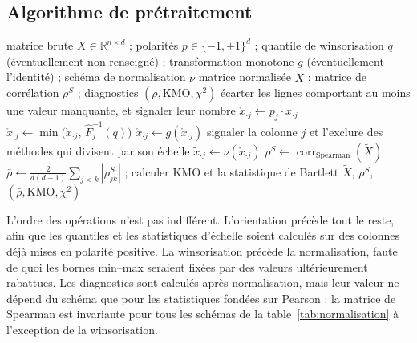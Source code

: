 \documentclass[11pt,a4paper]{article}
\theoremstyle{definition}
\theoremstyle{remark}
\newcommand{\R}{\mathbb{R}}
\newcommand{\abs}[1]{\left\lvert #1 \right\rvert}
\begin{document}
\bigskip

\subsection{Algorithme de prétraitement}

\medskip

\begin{algorithm}[htbp]
  \caption{Prétraitement}
  \label{algo:pretraitement}
  \begin{algorithmic}[1]
    \Require matrice brute $X \in \R^{n \times d}$ ; polarités $p \in \{-1,+1\}^d$ ;
      quantile de winsorisation $q$ (éventuellement non renseigné) ; transformation
      monotone $g$ (éventuellement l'identité) ; schéma de normalisation $\nu$
    \Ensure matrice normalisée $\tilde{X}$ ; matrice de corrélation $\rho^S$ ;
      diagnostics $(\bar{\rho},\mathrm{KMO},\chi^2)$
    \State écarter les lignes comportant au moins une valeur manquante, et signaler leur
      nombre 
      \State $\mathring{x}_{\cdot j} \gets p_j \cdot x_{\cdot j}$
        \State $\mathring{x}_{\cdot j} \gets
          \min\!\big(\mathring{x}_{\cdot j},\, \hat{F}_j^{-1}(q)\big)$
      \EndIf
      \State $\mathring{x}_{\cdot j} \gets g(\mathring{x}_{\cdot j})$
        \State signaler la colonne $j$ et l'exclure des méthodes qui divisent par son
          échelle
      \EndIf
      \State $\tilde{x}_{\cdot j} \gets \nu(\mathring{x}_{\cdot j})$
    \EndFor
    \State $\rho^S \gets \operatorname{corr}_{\text{Spearman}}(\tilde{X})$
    \State $\bar{\rho} \gets \frac{2}{d(d-1)}\sum_{j<k} \abs{\rho^S_{jk}}$ ;
      calculer $\mathrm{KMO}$ et la statistique de Bartlett
    \State \Return $\tilde{X}$, $\rho^S$, $(\bar{\rho},\mathrm{KMO},\chi^2)$
  \end{algorithmic}
\end{algorithm}

\bigskip

L'ordre des opérations n'est pas indifférent. L'orientation précède tout le reste, afin
que les quantiles et les statistiques d'échelle soient calculés sur des colonnes déjà
mises en polarité positive. La winsorisation précède la normalisation, faute de quoi les
bornes min--max seraient fixées par des valeurs ultérieurement rabattues. Les diagnostics
sont calculés après normalisation, mais leur valeur ne dépend du schéma que pour les
statistiques fondées sur Pearson : la matrice de Spearman est invariante pour tous les
schémas de la table~\ref{tab:normalisation} à l'exception de la winsorisation.
\end{document}
